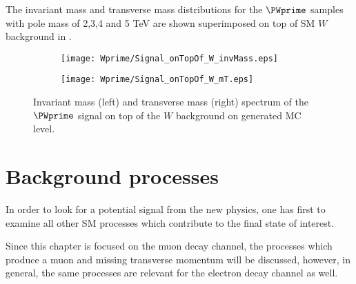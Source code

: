 The invariant mass and transverse mass distributions for the $\PWprime$ samples with pole mass of 2,3,4 and 5 TeV are shown superimposed on top of SM $W$ background in .

\begin{figure}
\begin{subfigure}{.5\textwidth}
  \centering
  \texttt{[image: Wprime/Signal\_onTopOf\_W\_invMass.eps]}
\end{subfigure}%
\begin{subfigure}{.5\textwidth}
  \centering
  \texttt{[image: Wprime/Signal\_onTopOf\_W\_mT.eps]}
\end{subfigure}
\caption{Invariant mass (left) and transverse mass (right) spectrum of the $\PWprime$ signal on top of the $W$ background on generated MC level.}
  \label{fig:signal_with_W}
\end{figure}



\section{Background processes}
\label{sec:wprimeBackgrounds}

In order to look for a potential signal from the new physics, one has first to examine all other SM processes which contribute to the final state of interest.


Since this chapter is focused on the muon decay channel, the processes which produce a muon and missing transverse momentum will be discussed, 
however, in general, the same processes are relevant for the electron decay channel as well.

